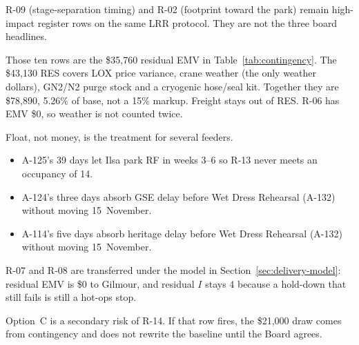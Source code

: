 R-09 (stage-separation timing) and R-02 (footprint toward the park) remain high-impact register rows on the same LRR protocol. They are not the three board headlines.

Those ten rows are the \$35{,}760 residual EMV in Table~\ref{tab:contingency}. The \$43{,}130 RES covers LOX price variance, crane weather (the only weather dollars), GN2/N2 purge stock and a cryogenic hose/seal kit. Together they are \$78{,}890, 5.26\% of base, not a 15\% markup. Freight stays out of RES. R-06 has EMV \$0, so weather is not counted twice.

Float, not money, is the treatment for several feeders.
\begin{itemize}[leftmargin=1.4em,itemsep=0.25em]
\item A-125's 39 days let Ilsa park RF in weeks 3--6 so R-13 never meets an occupancy of 14.
\item A-124's three days absorb GSE delay before Wet Dress Rehearsal (A-132) without moving 15~November.
\item A-114's five days absorb heritage delay before Wet Dress Rehearsal (A-132) without moving 15~November.
\end{itemize}

R-07 and R-08 are transferred under the model in Section~\ref{sec:delivery-model}: residual EMV is \$0 to Gilmour, and residual $I$ stays 4 because a hold-down that still fails is still a hot-ops stop.

Option~C is a secondary risk of R-14. If that row fires, the \$21{,}000 draw comes from contingency and does not rewrite the baseline until the Board agrees.
